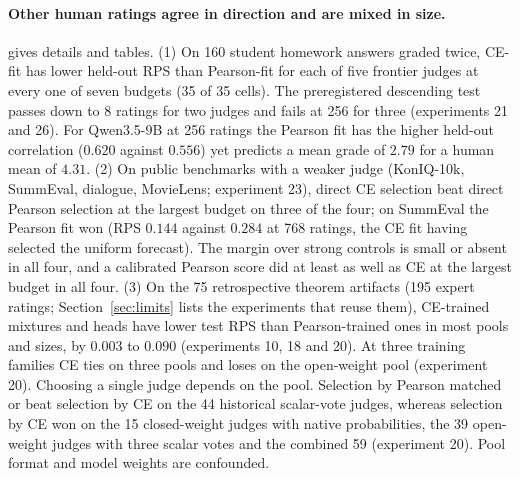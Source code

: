 \paragraph{Other human ratings agree in direction and are mixed in size.}
 gives details and tables.
(1) On 160 student homework answers graded twice, CE-fit has lower held-out RPS than Pearson-fit for each of five frontier judges at every one of seven budgets (35 of 35 cells).
The preregistered descending test passes down to 8 ratings for two judges and fails at 256 for three (experiments 21 and 26).
For Qwen3.5-9B at 256 ratings the Pearson fit has the higher held-out correlation ($0.620$ against $0.556$) yet predicts a mean grade of $2.79$ for a human mean of $4.31$.
(2) On public benchmarks with a weaker judge (KonIQ-10k, SummEval, dialogue, MovieLens; experiment 23), direct CE selection beat direct Pearson selection at the largest budget on three of the four; on SummEval the Pearson fit won (RPS $0.144$ against $0.284$ at 768 ratings, the CE fit having selected the uniform forecast).
The margin over strong controls is small or absent in all four, and a calibrated Pearson score did at least as well as CE at the largest budget in all four.
(3) On the 75 retrospective theorem artifacts (195 expert ratings; Section~\ref{sec:limits} lists the experiments that reuse them), CE-trained mixtures and heads have lower test RPS than Pearson-trained ones in most pools and sizes, by $0.003$ to $0.090$ (experiments 10, 18 and 20).
At three training families CE ties on three pools and loses on the open-weight pool (experiment 20).
Choosing a single judge depends on the pool.
Selection by Pearson matched or beat selection by CE on the 44 historical scalar-vote judges, whereas selection by CE won on the 15 closed-weight judges with native probabilities, the 39 open-weight judges with three scalar votes and the combined 59 (experiment 20).
Pool format and model weights are confounded.
